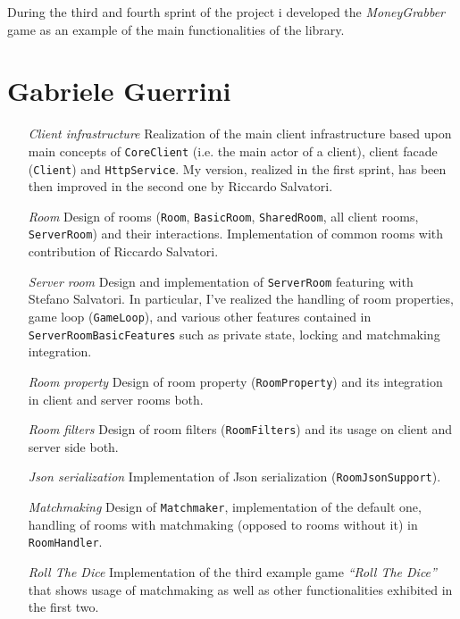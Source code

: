 During the third and fourth sprint of the project i developed the \textit{MoneyGrabber} game as an example of the main functionalities of the library. 

\section{Gabriele Guerrini}

\begin{itemize}

\item[\em{Client infrastructure}] Realization of the main client infrastructure based upon main concepts of \texttt{CoreClient} (i.e. the main actor of a client), client facade (\texttt{Client}) and \texttt{HttpService}. My version, realized in the first sprint, has been then improved in the second one by Riccardo Salvatori.   

\item[\em{Room}] Design of rooms (\texttt{Room}, \texttt{BasicRoom}, \texttt{SharedRoom}, all client rooms, \texttt{ServerRoom}) and their interactions. Implementation of common rooms with contribution of Riccardo Salvatori.

\item[\em{Server room}] Design and implementation of \texttt{ServerRoom} featuring with Stefano Salvatori. In particular, I've realized the handling of room properties, game loop (\texttt{GameLoop}), and various other features contained in \texttt{ServerRoomBasicFeatures} such as private state, locking and matchmaking integration.

\item[\em{Room property}] Design of room property (\texttt{RoomProperty}) and its integration in client and server rooms both.

\item[\em{Room filters}] Design of room filters (\texttt{RoomFilters}) and its usage on client and server side both.

\item[\em{Json serialization}] Implementation of Json serialization (\texttt{RoomJsonSupport}).

\item[\em{Matchmaking}] Design of \texttt{Matchmaker}, implementation of the default one, handling of rooms with matchmaking (opposed to rooms without it) in \texttt{RoomHandler}.

\item[\em{Roll The Dice}] Implementation of the third example game \textit{``Roll The Dice''} that shows usage of matchmaking as well as other functionalities exhibited in the first two.

\end{itemize}

